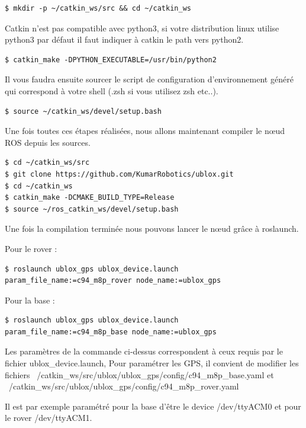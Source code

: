 \begin{lstlisting}[style=msgTerminal]
$ mkdir -p ~/catkin_ws/src && cd ~/catkin_ws
\end{lstlisting}

Catkin n'est pas compatible avec python3, si votre distribution linux utilise python3 par défaut il faut indiquer à catkin le path vers python2.

\begin{lstlisting}[style=msgTerminal]
$ catkin_make -DPYTHON_EXECUTABLE=/usr/bin/python2
\end{lstlisting}

Il vous faudra ensuite sourcer le script de configuration d’environnement généré qui correspond à votre shell (.zsh si vous utilisez zsh etc..).

\begin{lstlisting}[style=msgTerminal]
$ source ~/catkin_ws/devel/setup.bash
\end{lstlisting}

Une fois toutes ces étapes réalisées, nous allons maintenant compiler le nœud ROS depuis les sources.
\begin{lstlisting}[style=msgTerminal]
$ cd ~/catkin_ws/src
$ git clone https://github.com/KumarRobotics/ublox.git
$ cd ~/catkin_ws
$ catkin_make -DCMAKE_BUILD_TYPE=Release
$ source ~/ros_catkin_ws/devel/setup.bash
\end{lstlisting}

Une fois la compilation terminée nous pouvons lancer le nœud grâce à roslaunch.

Pour le rover :
\begin{lstlisting}[style=msgTerminal]
$ roslaunch ublox_gps ublox_device.launch param_file_name:=c94_m8p_rover node_name:=ublox_gps
\end{lstlisting}

Pour la base :
\begin{lstlisting}[style=msgTerminal]
$ roslaunch ublox_gps ublox_device.launch param_file_name:=c94_m8p_base node_name:=ublox_gps
\end{lstlisting}

Les paramètres de la commande ci-dessus correspondent à ceux requis par le fichier ublox\_device.launch,
Pour paramétrer les GPS, il convient de modifier les fichiers ~/catkin\_ws/src/ublox/ublox\_gps/config/c94\_m8p\_base.yaml et \\~/catkin\_ws/src/ublox/ublox\_gps/config/c94\_m8p\_rover.yaml

Il est par exemple paramétré pour la base d'être le device /dev/ttyACM0 et pour le rover /dev/ttyACM1.

